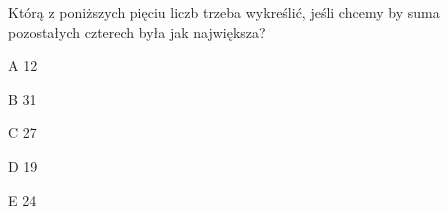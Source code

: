 \begin{tresc}
Którą z poniższych pięciu liczb trzeba wykreślić, jeśli chcemy by suma pozostałych czterech była jak największa?
\end{tresc}
\begin{wariant}{A} 12 \end{wariant}
\begin{wariant}{B} 31 \end{wariant}
\begin{wariant}{C} 27 \end{wariant}
\begin{wariant}{D} 19 \end{wariant}
\begin{wariant}{E} 24 \end{wariant}
